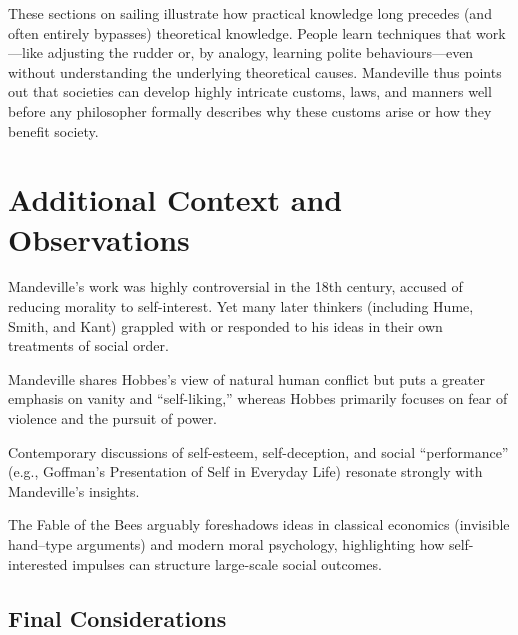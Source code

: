             These sections on sailing illustrate how practical knowledge long precedes (and often entirely bypasses) theoretical knowledge. People learn techniques that work—like adjusting the rudder or, by analogy, learning polite behaviours—even without understanding the underlying theoretical causes. Mandeville thus points out that societies can develop highly intricate customs, laws, and manners well before any philosopher formally describes why these customs arise or how they benefit society.

\newpage
\section*{Additional Context and Observations}

    \begin{remark}
        Mandeville’s work was highly controversial in the 18th century, accused of reducing morality to self-interest. Yet many later thinkers (including Hume, Smith, and Kant) grappled with or responded to his ideas in their own treatments of social order.
    \end{remark}    

    \begin{remark}
        Mandeville shares Hobbes’s view of natural human conflict but puts a greater emphasis on vanity and “self-liking,” whereas Hobbes primarily focuses on fear of violence and the pursuit of power.
    \end{remark}

    \begin{remark}
        Contemporary discussions of self-esteem, self-deception, and social “performance” (e.g., Goffman’s Presentation of Self in Everyday Life) resonate strongly with Mandeville’s insights.
    \end{remark}

    \begin{remark}
        The Fable of the Bees arguably foreshadows ideas in classical economics (invisible hand–type arguments) and modern moral psychology, highlighting how self-interested impulses can structure large-scale social outcomes.
    \end{remark}

    \subsection*{Final Considerations}

